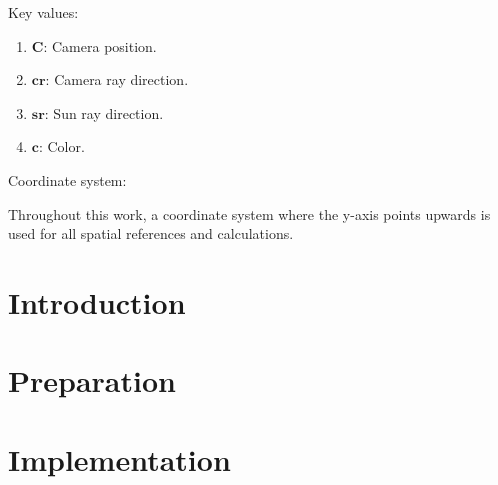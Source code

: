 \documentclass[12pt,a4paper,twoside,openright]{report}
\begin{document}
Key values:

\begin{enumerate}
    \item $\mathbf{C}$: Camera position.
    \item $\mathbf{cr}$: Camera ray direction.
    \item $\mathbf{sr}$: Sun ray direction.
    \item $\mathbf{c}$: Color. 
\end{enumerate}

Coordinate system:

Throughout this work, a coordinate system where the y-axis points upwards is used for all spatial references and calculations.



\newpage 

\tableofcontents


\newpage
{}
\setcounter{page}{1}







\chapter{Introduction}


\chapter{Preparation}


\chapter{Implementation}

\end{document}
